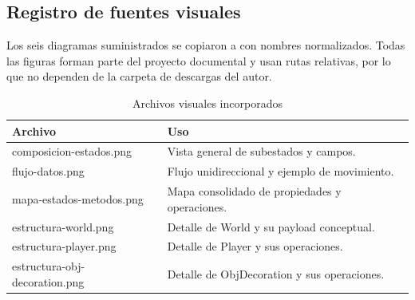 \subsection{Registro de fuentes visuales}

Los seis diagramas suministrados se copiaron a  con nombres normalizados. Todas las figuras forman parte del proyecto documental y usan rutas relativas, por lo que no dependen de la carpeta de descargas del autor.

\begin{table}[H]
\centering
\caption{Archivos visuales incorporados}
\begin{tabularx}{\textwidth}{>{\ttfamily}p{6.4cm}X}
\toprule
\normalfont\bfseries Archivo & \normalfont\bfseries Uso \\
\midrule
composicion-estados.png & Vista general de subestados y campos. \\
flujo-datos.png & Flujo unidireccional y ejemplo de movimiento. \\
mapa-estados-metodos.png & Mapa consolidado de propiedades y operaciones. \\
estructura-world.png & Detalle de World y su payload conceptual. \\
estructura-player.png & Detalle de Player y sus operaciones. \\
estructura-obj-decoration.png & Detalle de ObjDecoration y sus operaciones. \\
\bottomrule
\end{tabularx}
\end{table}
